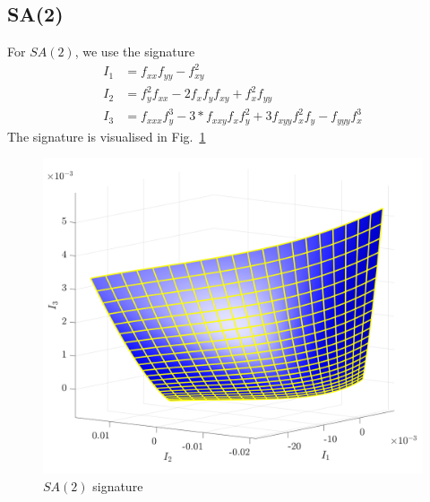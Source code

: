 \documentclass[11pt]{article}
\begin{document}
\subsection{SA(2)}
For $SA(2)$, we use the signature
\begin{equation}\label{eq:sa2sig}
  \begin{split}
    I_1 &= f_{xx}f_{yy} - f_{xy}^2  \\
    I_2 &= f_y^2f_{xx} - 2f_x f_y f_{xy} + f_x^2f_{yy} \\
    I_3 &= f_{xxx}f_y^3 - 3*f_{xxy}f_x f_y^2 + 3f_{xyy}f_x^2f_y - f_{yyy}f_x^3
  \end{split}
\end{equation}
The signature is visualised in Fig.~\ref{fig:sa2signature}
\begin{figure}
  \centering
    \includegraphics[width=12cm]{figures/SA2_signature}
  \caption{$SA(2)$ signature}
  \label{fig:sa2signature}
\end{figure}
\end{document}
